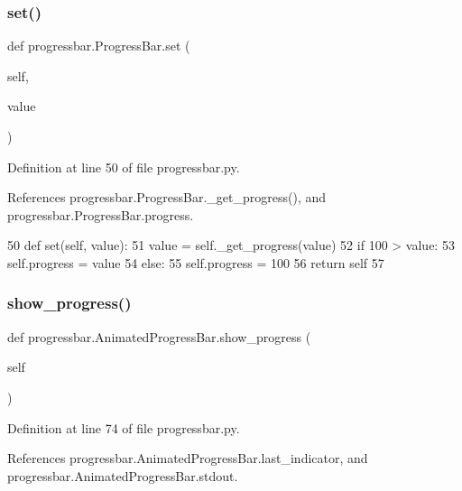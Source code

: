 \subsubsection{\texorpdfstring{set()}{set()}}
{\footnotesize\ttfamily def progressbar.\+Progress\+Bar.\+set (\begin{DoxyParamCaption}\item[{}]{self,  }\item[{}]{value }\end{DoxyParamCaption})\hspace{0.3cm}{\ttfamily [inherited]}}



Definition at line 50 of file progressbar.\+py.



References progressbar.\+Progress\+Bar.\+\_\+get\+\_\+progress(), and progressbar.\+Progress\+Bar.\+progress.


\begin{DoxyCode}
50     \textcolor{keyword}{def }set(self, value):
51         value = self.\_get\_progress(value)
52         \textcolor{keywordflow}{if} 100 > value:
53             self.progress = value 
54         \textcolor{keywordflow}{else}:
55             self.progress = 100
56         \textcolor{keywordflow}{return} self
57 
\end{DoxyCode}
\mbox{\label{classprogressbar_1_1AnimatedProgressBar_a87d45550598b83128ee14b4d7acdea27}} 
\subsubsection{\texorpdfstring{show\+\_\+progress()}{show\_progress()}}
{\footnotesize\ttfamily def progressbar.\+Animated\+Progress\+Bar.\+show\+\_\+progress (\begin{DoxyParamCaption}\item[{}]{self }\end{DoxyParamCaption})}



Definition at line 74 of file progressbar.\+py.



References progressbar.\+Animated\+Progress\+Bar.\+last\+\_\+indicator, and progressbar.\+Animated\+Progress\+Bar.\+stdout.


